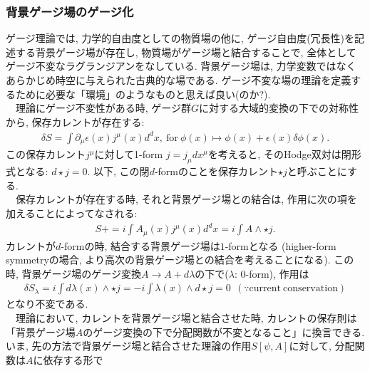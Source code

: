\subsubsection{背景ゲージ場のゲージ化}
ゲージ理論では, 力学的自由度としての物質場の他に, ゲージ自由度(冗長性)を記述する背景ゲージ場が存在し, 
物質場がゲージ場と結合することで, 全体としてゲージ不変なラグランジアンをなしている. 
背景ゲージ場は, 力学変数ではなくあらかじめ時空に与えられた古典的な場である. 
ゲージ不変な場の理論を定義するために必要な「環境」のようなものと思えば良い(のか?). \\
　理論にゲージ不変性がある時, ゲージ群$G$に対する大域的変換の下での対称性から, 保存カレントが存在する: 
\begin{align}
    \delta S = \int \partial_\mu \epsilon(x)j^\mu (x)d^dx, ~ 
    \mathrm{for}~ \phi(x)\mapsto \phi(x)+ \epsilon(x)\delta \phi(x). 
\end{align}
この保存カレント$j^{\mu}$に対して1-form $j=j_{\mu}dx^{\mu}$を考えると, 
そのHodge双対は閉形式となる: $d\star j=0$. 
以下, この閉$d$-formのことを保存カレント$\star j$と呼ぶことにする. \\
　保存カレントが存在する時, それと背景ゲージ場との結合は, 作用に次の項を加えることによってなされる: 
\begin{align}
    S + = i\int A_{\mu}(x)j^\mu(x)d^d x = i\int A\wedge \star j. 
\end{align}
カレントが$d$-formの時, 結合する背景ゲージ場は$1$-formとなる
(higher-form symmetryの場合, より高次の背景ゲージ場との結合を考えることになる). 
この時, 背景ゲージ場のゲージ変換$A\to A + d\lambda$の下で($\lambda$: $0$-form), 
作用は
\begin{align}
    \delta S_{\lambda} = i\int d\lambda(x) \wedge \star j
    =- i\int \lambda(x)\wedge d\star j
    =0 ~~(\because \mathrm{current~conservation})
\end{align}
となり不変である. \\
　理論において, カレントを背景ゲージ場と結合させた時, カレントの保存則は
「背景ゲージ場$A$のゲージ変換の下で分配関数が不変となること」に換言できる. 
いま, 先の方法で背景ゲージ場と結合させた理論の作用$S[\psi, A]$に対して, 分配関数は$A$に依存する形で

